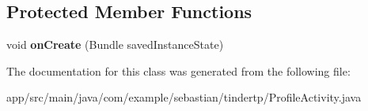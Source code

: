\subsection*{Protected Member Functions}
\begin{DoxyCompactItemize}
\item 
void {\bfseries on\+Create} (Bundle saved\+Instance\+State)\hypertarget{classcom_1_1example_1_1sebastian_1_1tindertp_1_1ProfileActivity_a2aacc09a50bf2c48c83c5d2b94ec5810}{}\label{classcom_1_1example_1_1sebastian_1_1tindertp_1_1ProfileActivity_a2aacc09a50bf2c48c83c5d2b94ec5810}

\end{DoxyCompactItemize}


The documentation for this class was generated from the following file\+:\begin{DoxyCompactItemize}
\item 
app/src/main/java/com/example/sebastian/tindertp/Profile\+Activity.\+java\end{DoxyCompactItemize}
